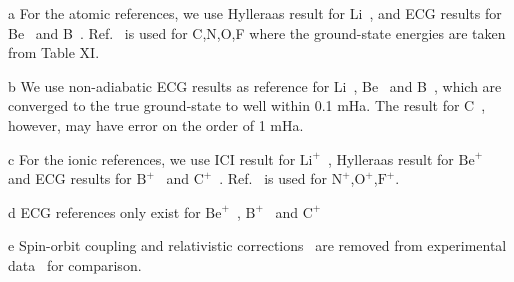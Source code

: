 \begin{table*}[t!]
\begin{threeparttable}
\begin{tablenotes}
\item[a] For the atomic references, we use Hylleraas result for Li~\cite{Wang_Li}, and ECG results for Be~\cite{Stanke_Be} and B~\cite{Bubin_B}. Ref.~\cite{Davidson_Atoms} is used for C,N,O,F where the ground-state energies are taken from Table XI.
\item[b] We use non-adiabatic ECG results as reference for Li~\cite{Stanke_Li}, Be~\cite{Bubin_BeH_noBO} and B~\cite{Bubin_B}, which are converged to the true ground-state to well within 0.1 mHa. The result for C~\cite{Bubin_C}, however, may have error on the order of 1 mHa.
\item[c] For the ionic references, we use ICI result for $\text{Li}^+$~\cite{Nakashima_Li+}, Hylleraas result for $\text{Be}^+$~\cite{Puchalski_Be+} and ECG results for $\text{B}^+$~\cite{Bubin_B+} and $\text{C}^+$~\cite{Bubin_C+,mitroy2013}. Ref.~\cite{Davidson_Atoms} is used for $\text{N}^+$,$\text{O}^+$,$\text{F}^+$.
\item[d] ECG references only exist for $\text{Be}^+$~\cite{Bubin_BeH_noBO}, $\text{B}^+$~\cite{Bubin_B+} and $\text{C}^+$~\cite{Bubin_C+}
\item[e] Spin-orbit coupling and relativistic corrections~\cite{Klopper_IP} are removed from experimental data~\cite{NIST_Atoms} for comparison.
\end{tablenotes}

\end{threeparttable}
\end{table*}